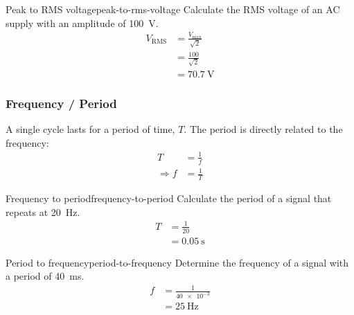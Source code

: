 \documentclass{pgnotes}
\begin{document}
\begin{example}{Peak to RMS voltage}{peak-to-rms-voltage}
  Calculate the RMS voltage of an AC supply with an amplitude of \SI{100}{\volt}.
  \tcblower
  \begin{align}
    V_{\mbox{RMS}} & = \frac{V_{\mbox{max}}}{\sqrt{2}} \\
                   & = \frac{100}{\sqrt{2}} \\
                   & = \SI{70.7}{\volt} 
  \end{align}
\end{example}

\subsubsection{Frequency / Period}
A single cycle lasts for a period of time, $T$.
The period is directly related to the frequency:
\begin{align}
  T & = \frac{1}{f} \\
      \Rightarrow f & = \frac{1}{T}
\end{align}
\begin{example}{Frequency to period}{frequency-to-period}
  Calculate the period of a signal that repeats at \SI{20}{\hertz}.
  \tcblower
  \begin{align}
    T & = \frac{1}{20} \\
      & = \SI{0.05}{\second} 
  \end{align}
\end{example}
\begin{example}{Period to frequency}{period-to-frequency}
  Determine the frequency of a signal with a period of \SI{40}{\milli\second}.
  \tcblower
  \begin{align}
    f & = \frac{1}{\num{40e-3}} \\
      & = \SI{25}{\hertz}
  \end{align}
\end{example}


\end{document}
